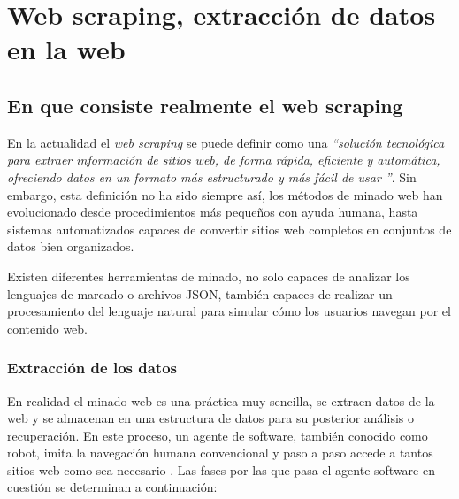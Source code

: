 \chapter{Web scraping, extracción de datos en la web}
\label{cha:web scraping, extraccion de datos en la web}

\section{En que consiste realmente el web scraping}
\label{sec:en que consiste realmente el web scraping}

En la actualidad el \emph{web scraping} se puede definir como una \emph{“solución tecnológica para extraer
información de sitios web, de forma rápida, eficiente y automática, ofreciendo datos en un formato más
estructurado y más fácil de usar \cite{web-scraping-osmar-castrillo}”}. Sin embargo, esta definición no ha
sido siempre así, los métodos de minado web han evolucionado desde procedimientos más pequeños con ayuda
humana, hasta sistemas automatizados capaces de convertir sitios web completos en conjuntos de datos bien
organizados.

Existen diferentes herramientas de minado, no solo capaces de analizar los lenguajes de marcado o archivos
JSON, también capaces de realizar un procesamiento del lenguaje natural para simular cómo los usuarios
navegan por el contenido web.

\subsection{Extracción de los datos}
\label{subsec:extraccion de los datos}

En realidad el minado web es una práctica muy sencilla, se extraen datos de la web y se almacenan en una
estructura de datos para su posterior análisis o recuperación. En este proceso, un agente de software,
también conocido como robot, imita la navegación humana convencional y paso a paso accede a tantos sitios
web como sea necesario \cite{web-scraping-api-world}. Las fases por las que pasa el agente software en
cuestión se determinan a continuación:

